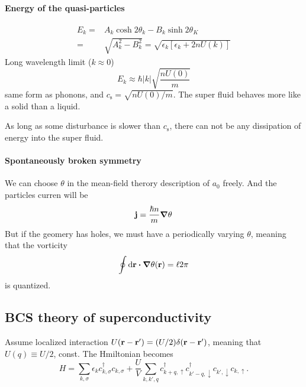 \documentclass[11pt,letter, swedish, english, twocolumn
]{article}
\newcommand{\cs}{\ensuremath{{c_{\text{s}}}}}
\begin{document}
\paragraph{Energy of the quasi-particles}
\begin{equation}
\begin{aligned}
E_k=&A_k\cosh2\theta_k-B_k\sinh2\theta_K\\
=&\sqrt{A_k^2-B_k^2}=\sqrt{\epsilon_k[\epsilon_k+2nU(k)]}
\end{aligned}
\end{equation}
Long wavelength limit ($k\approx0$)
\begin{equation}
E_k\approx\hbar|k|\sqrt{\frac{nU(0)}{m}}
\end{equation}
same form as phonons, and $\cs=\sqrt{nU(0)/m}$. The super fluid
behaves more like a solid than a liquid. 

As long as some disturbance is slower than $\cs$, there can not be any
dissipation of energy into the super fluid. 

\paragraph{Spontaneously broken symmetry}
We can choose $\theta$ in the mean-field therory description of $a_0$
freely. And the particles curren will be
\begin{equation}
\vb{j}=\frac{\hbar n}{m} \grad\theta
\end{equation}
But if the geomery has holes, we must have a periodically varying
$\theta$, meaning that the vorticity
\begin{equation}
\oint\rd\vb{r}\vdot\grad\theta(\vb{r})=\ell2\pi
\end{equation}
is quantized.


\subsection{BCS theory of superconductivity}
Assume localized interaction
$U(\vb{r}-\vb{r}')=(U/2)\delta(\vb{r}-\vb{r}')$, meaning that
$U(q)\equiv U/2$, const.
The Hmiltonian becomes
\begin{equation}
H=\sum_{k, \sigma} \epsilon_k c_{k,\sigma}^\dagger c_{k,\sigma}
+\frac{U}{V}\sum_{k, k', q} 
c_{k+q,\uparrow}^\dagger c_{k'-q,\downarrow}^\dagger 
c_{k',\downarrow}c_{k,\uparrow}.
\end{equation}
\end{document}
